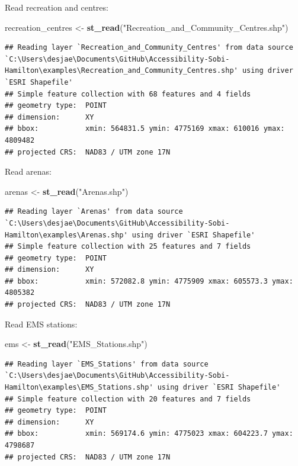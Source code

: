 \documentclass[
]{article}
\newenvironment{Shaded}{\begin{snugshade}}{\end{snugshade}}
\newcommand{\KeywordTok}[1]{\textcolor[rgb]{0.13,0.29,0.53}{\textbf{#1}}}
\newcommand{\NormalTok}[1]{#1}
\newcommand{\StringTok}[1]{\textcolor[rgb]{0.31,0.60,0.02}{#1}}
\begin{document}
Read recreation and centres:

\begin{Shaded}
\begin{Highlighting}[]
\NormalTok{recreation_centres <-}\StringTok{ }\KeywordTok{st_read}\NormalTok{(}\StringTok{"Recreation_and_Community_Centres.shp"}\NormalTok{)}
\end{Highlighting}
\end{Shaded}

\begin{verbatim}
## Reading layer `Recreation_and_Community_Centres' from data source `C:\Users\desjae\Documents\GitHub\Accessibility-Sobi-Hamilton\examples\Recreation_and_Community_Centres.shp' using driver `ESRI Shapefile'
## Simple feature collection with 68 features and 4 fields
## geometry type:  POINT
## dimension:      XY
## bbox:           xmin: 564831.5 ymin: 4775169 xmax: 610016 ymax: 4809482
## projected CRS:  NAD83 / UTM zone 17N
\end{verbatim}

Read arenas:

\begin{Shaded}
\begin{Highlighting}[]
\NormalTok{arenas <-}\StringTok{ }\KeywordTok{st_read}\NormalTok{(}\StringTok{"Arenas.shp"}\NormalTok{)}
\end{Highlighting}
\end{Shaded}

\begin{verbatim}
## Reading layer `Arenas' from data source `C:\Users\desjae\Documents\GitHub\Accessibility-Sobi-Hamilton\examples\Arenas.shp' using driver `ESRI Shapefile'
## Simple feature collection with 25 features and 7 fields
## geometry type:  POINT
## dimension:      XY
## bbox:           xmin: 572082.8 ymin: 4775909 xmax: 605573.3 ymax: 4805382
## projected CRS:  NAD83 / UTM zone 17N
\end{verbatim}

Read EMS stations:

\begin{Shaded}
\begin{Highlighting}[]
\NormalTok{ems <-}\StringTok{ }\KeywordTok{st_read}\NormalTok{(}\StringTok{"EMS_Stations.shp"}\NormalTok{)}
\end{Highlighting}
\end{Shaded}

\begin{verbatim}
## Reading layer `EMS_Stations' from data source `C:\Users\desjae\Documents\GitHub\Accessibility-Sobi-Hamilton\examples\EMS_Stations.shp' using driver `ESRI Shapefile'
## Simple feature collection with 20 features and 7 fields
## geometry type:  POINT
## dimension:      XY
## bbox:           xmin: 569174.6 ymin: 4775023 xmax: 604223.7 ymax: 4798687
## projected CRS:  NAD83 / UTM zone 17N
\end{verbatim}
\end{document}
